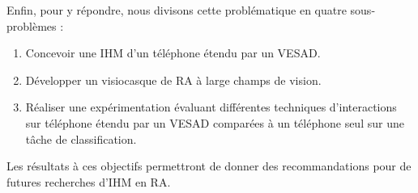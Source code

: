 Enfin, pour y répondre, nous divisons cette problématique en quatre sous-problèmes :
\begin{enumerate}
  \item Concevoir une IHM d'un téléphone étendu par un VESAD.
  \item Développer un visiocasque de RA à large champs de vision.
  \item Réaliser une expérimentation évaluant différentes techniques d'interactions sur téléphone étendu par un VESAD comparées à un téléphone seul sur une tâche de classification.
\end{enumerate}

Les résultats à ces objectifs permettront de donner des recommandations pour de futures recherches d'IHM en RA.